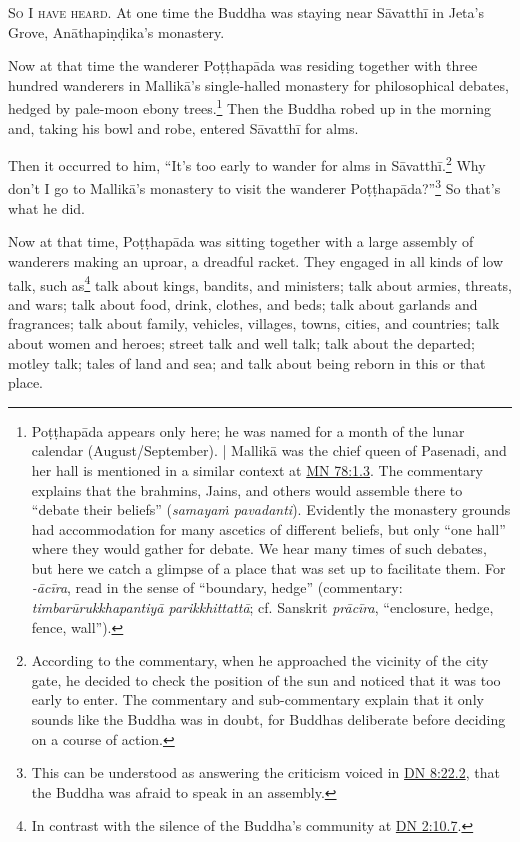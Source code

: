 \documentclass[12pt,openany]{book}%
\newcommand*{\scevam}[1]{\textsc{#1}}
\begin{document}
\scevam{So I have heard. }At one time the Buddha was staying near \textsanskrit{Sāvatthī} in Jeta’s Grove, \textsanskrit{Anāthapiṇḍika}’s monastery. 

Now at that time the wanderer \textsanskrit{Poṭṭhapāda} was residing together with three hundred wanderers in \textsanskrit{Mallikā}’s single-halled monastery for philosophical debates, hedged by pale-moon ebony trees.\footnote{\textsanskrit{Poṭṭhapāda} appears only here; he was named for a month of the lunar calendar (August/September). | \textsanskrit{Mallikā} was the chief queen of Pasenadi, and her hall is mentioned in a similar context at \href{https://suttacentral.net/mn78/en/sujato\#1.3}{MN 78:1.3}. The commentary explains that the brahmins, Jains, and others would assemble there to “debate their beliefs” (\textit{\textsanskrit{samayaṁ} pavadanti}). Evidently the monastery grounds had accommodation for many ascetics of different beliefs, but only “one hall” where they would gather for debate. We hear many times of such debates, but here we catch a glimpse of a place that was set up to facilitate them. For \textit{-\textsanskrit{ācīra}}, read in the sense of “boundary, hedge” (commentary: \textit{\textsanskrit{timbarūrukkhapantiyā} \textsanskrit{parikkhittattā}}; cf. Sanskrit \textit{\textsanskrit{prācīra}}, “enclosure, hedge, fence, wall”). } Then the Buddha robed up in the morning and, taking his bowl and robe, entered \textsanskrit{Sāvatthī} for alms. 

Then it occurred to him, “It’s too early to wander for alms in \textsanskrit{Sāvatthī}.\footnote{According to the commentary, when he approached the vicinity of the city gate, he decided to check the position of the sun and noticed that it was too early to enter. The commentary and sub-commentary explain that it only sounds like the Buddha was in doubt, for Buddhas deliberate before deciding on a course of action. } Why don’t I go to \textsanskrit{Mallikā}’s monastery to visit the wanderer \textsanskrit{Poṭṭhapāda}?”\footnote{This can be understood as answering the criticism voiced in \href{https://suttacentral.net/dn8/en/sujato\#22.2}{DN 8:22.2}, that the Buddha was afraid to speak in an assembly. } So that’s what he did. 

Now at that time, \textsanskrit{Poṭṭhapāda} was sitting together with a large assembly of wanderers making an uproar, a dreadful racket. They engaged in all kinds of low talk, such as\footnote{In contrast with the silence of the Buddha’s community at \href{https://suttacentral.net/dn2/en/sujato\#10.7}{DN 2:10.7}. } talk about kings, bandits, and ministers; talk about armies, threats, and wars; talk about food, drink, clothes, and beds; talk about garlands and fragrances; talk about family, vehicles, villages, towns, cities, and countries; talk about women and heroes; street talk and well talk; talk about the departed; motley talk; tales of land and sea; and talk about being reborn in this or that place. 
\end{document}
